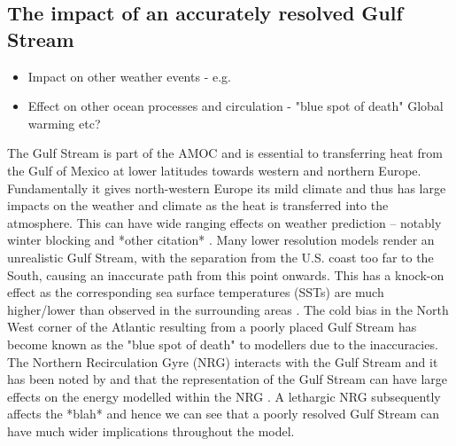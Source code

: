 \documentclass[a4paper,11pt]{article}
\begin{document}
\subsection{The impact of an accurately resolved Gulf Stream}
\begin{itemize}
  \item Impact on other weather events - e.g.  \citep{Scaife2011a}
  \item Effect on other ocean processes and circulation - "blue spot of death"    
  \todo Global warming etc?
\end{itemize}
The Gulf Stream is part of the AMOC and is essential to transferring heat from the Gulf of Mexico at lower latitudes towards western and northern Europe. Fundamentally it gives north-western Europe its mild climate and thus has large impacts on the weather and climate as the heat is transferred into the atmosphere. This can have wide ranging effects on weather prediction – notably winter blocking \citep{Scaife2011a} and *other citation* . Many lower resolution models render an unrealistic Gulf Stream, with the separation from the U.S. coast too far to the South, causing an inaccurate path from this point onwards. This has a knock-on effect as the corresponding sea surface temperatures (SSTs) are much higher/lower than observed in the surrounding areas \citep{Greatbatch2004}. The cold bias in the North West corner of the Atlantic resulting from a poorly placed Gulf Stream has become known as the "blue spot of death" \citep{Gnanadesikan2007} to modellers due to the inaccuracies.  The Northern Recirculation Gyre (NRG) interacts with the Gulf Stream and it has been noted by \citep{Zhang2007} and \citep{Ezer2016b} that the representation of the Gulf Stream can have large effects on the energy modelled within the NRG . A lethargic NRG subsequently affects the *blah* and hence we can see that a poorly resolved Gulf Stream can have much wider implications throughout the model.
\end{document}
